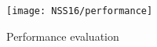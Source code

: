  \begin{figure} [t]
 	\centering
 	\texttt{[image: NSS16/performance]}
 	\caption{Performance evaluation}
 	\label{fig:performance}
 \end{figure}
